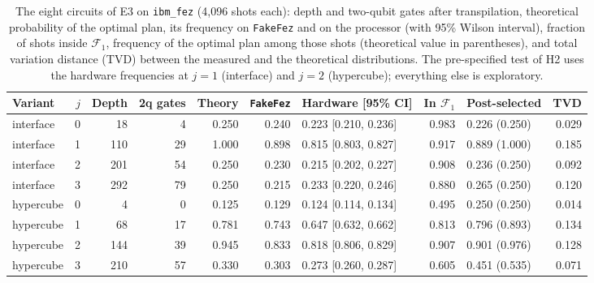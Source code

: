 \begin{table}[t]
\centering
\caption{The eight circuits of E3 on \texttt{ibm\_fez} (4{,}096 shots each): depth and two-qubit gates after transpilation, theoretical probability of the optimal plan, its frequency on \texttt{FakeFez} and on the processor (with 95\% Wilson interval), fraction of shots inside $\mathcal{F}_1$, frequency of the optimal plan among those shots (theoretical value in parentheses), and total variation distance (TVD) between the measured and the theoretical distributions. The pre-specified test of H2 uses the hardware frequencies at $j=1$ (interface) and $j=2$ (hypercube); everything else is exploratory.}\label{tab:hardware}
\footnotesize
\begin{tabular}{lrrrrrlrlr}
\toprule
Variant & $j$ & Depth & 2q gates & Theory & \texttt{FakeFez} & Hardware [95\% CI] & In $\mathcal{F}_1$ & Post-selected & TVD \\
\midrule
interface & 0 & 18 & 4 & 0.250 & 0.240 & 0.223 [0.210, 0.236] & 0.983 & 0.226 (0.250) & 0.029 \\
interface & 1 & 110 & 29 & 1.000 & 0.898 & 0.815 [0.803, 0.827] & 0.917 & 0.889 (1.000) & 0.185 \\
interface & 2 & 201 & 54 & 0.250 & 0.230 & 0.215 [0.202, 0.227] & 0.908 & 0.236 (0.250) & 0.092 \\
interface & 3 & 292 & 79 & 0.250 & 0.215 & 0.233 [0.220, 0.246] & 0.880 & 0.265 (0.250) & 0.120 \\
hypercube & 0 & 4 & 0 & 0.125 & 0.129 & 0.124 [0.114, 0.134] & 0.495 & 0.250 (0.250) & 0.014 \\
hypercube & 1 & 68 & 17 & 0.781 & 0.743 & 0.647 [0.632, 0.662] & 0.813 & 0.796 (0.893) & 0.134 \\
hypercube & 2 & 144 & 39 & 0.945 & 0.833 & 0.818 [0.806, 0.829] & 0.907 & 0.901 (0.976) & 0.128 \\
hypercube & 3 & 210 & 57 & 0.330 & 0.303 & 0.273 [0.260, 0.287] & 0.605 & 0.451 (0.535) & 0.071 \\
\bottomrule
\end{tabular}
\end{table}
